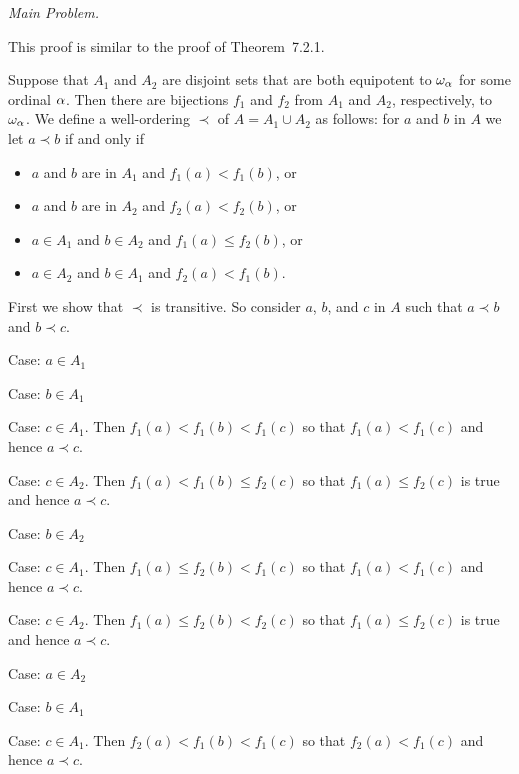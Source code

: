 \begin{solution}
    \emph{Main Problem.}

    This proof is similar to the proof of Theorem~7.2.1.

	Suppose that $A_1$ and $A_2$ are disjoint sets that are both equipotent to $\omega_\alpha$ for some ordinal $\alpha$.
    Then there are bijections $f_1$ and $f_2$ from $A_1$ and $A_2$, respectively, to $\omega_\alpha$.
    We define a well-ordering $\prec$ of $A = A_1 \cup A_2$ as follows: for $a$ and $b$ in $A$ we let $a \prec b$ if and only if
    \begin{itemize}
        \item $a$ and $b$ are in $A_1$ and $f_1(a) < f_1(b)$, or
        \item $a$ and $b$ are in $A_2$ and $f_2(a) < f_2(b)$, or
        \item $a \in A_1$ and $b \in A_2$ and $f_1(a) \leq f_2(b)$, or
        \item $a \in A_2$ and $b \in A_1$ and $f_2(a) < f_1(b)$.
    \end{itemize}

    First we show that $\prec$ is transitive.
    So consider $a$, $b$, and $c$ in $A$ such that $a \prec b$ and $b \prec c$.

    Case: $a \in A_1$
    \begin{indpar}
        Case: $b \in A_1$
        \begin{indpar}
            Case: $c \in A_1$.
            Then $f_1(a) < f_1(b) < f_1(c)$ so that $f_1(a) < f_1(c)$ and hence $a \prec c$.

            Case: $c \in A_2$.
            Then $f_1(a) < f_1(b) \leq f_2(c)$ so that $f_1(a) \leq f_2(c)$ is true and hence $a \prec c$.
        \end{indpar}

        Case: $b \in A_2$
        \begin{indpar}
            Case: $c \in A_1$.
            Then $f_1(a) \leq f_2(b) < f_1(c)$ so that $f_1(a) < f_1(c)$ and hence $a \prec c$.

            Case: $c \in A_2$.
            Then $f_1(a) \leq f_2(b) < f_2(c)$ so that $f_1(a) \leq f_2(c)$ is true and hence $a \prec c$.
        \end{indpar}
    \end{indpar}

    Case: $a \in A_2$
    \begin{indpar}
        Case: $b \in A_1$
        \begin{indpar}
            Case: $c \in A_1$.
            Then $f_2(a) < f_1(b) < f_1(c)$ so that $f_2(a) < f_1(c)$ and hence $a \prec c$.


\end{indpar}
\end{indpar}
\end{solution}
